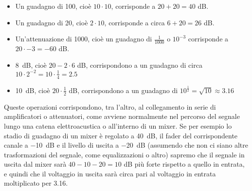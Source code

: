 \documentclass[11pt]{report}
\begin{document}
\begin{itemize}

\item Un guadagno di 100, cioè $10 \cdot 10$, corrisponde a $20 + 20 = 40$ dB.

\item Un guadagno di 20, cioè $2 \cdot 10$, corrisponde a circa $6 + 20 = 26$ dB.

\item Un'attenuazione di 1000, cioè un guadagno di $\frac{1}{1000}$ o $10^{-3}$ corrisponde a $20 \cdot -3 = -60$ dB.

\item \qty{8}{dB}, cioè $20 - 2 \cdot 6$ dB, corrispondono a un guadagno di circa $10 \cdot 2^{-2} = 10 \cdot \frac{1}{4} = 2.5$

\item \qty{10}{dB}, cioè $20 \cdot \frac{1}{2}$ dB, corrispondono a un guadagno di $10^\frac{1}{2} = \sqrt{10} \approx {3.16}$

\end{itemize}

Queste operazioni corrispondono, tra l'altro, al collegamento in serie di amplificatori o attenuatori, come avviene normalmente nel percorso del segnale lungo una catena elettroacustica o all'interno di un mixer. Se per esempio lo stadio di guadagno di un mixer è regolato a \qty{40}{dB}, il fader del corrispondente canale a \qty{-10}{dB} e il livello di uscita a \qty{-20}{dB} (assumendo che non ci siano altre trasformazioni del segnale, come equalizzazioni o altro) sapremo che il segnale in uscita dal mixer sarà $40-10-20 = 10$ dB più forte rispetto a quello in entrata, e quindi che il voltaggio in uscita sarà circa pari al voltaggio in entrata moltiplicato per 3.16.










\end{document}
